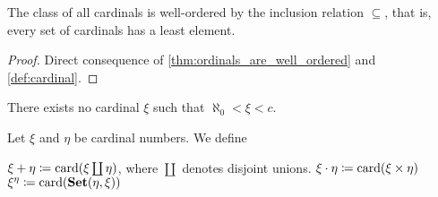 \begin{proposition}\label{thm:cardinals_well_ordered}
  The class of all cardinals is well-ordered by the inclusion relation \( \subseteq \), that is, every set of cardinals has a least element.
\end{proposition}
\begin{proof}
  Direct consequence of \cref{thm:ordinals_are_well_ordered} and \cref{def:cardinal}.
\end{proof}

\begin{hypothesis}\label{hyp:continuum_hypothesis}
  There exists no cardinal \( \xi \) such that \( \aleph_0 < \xi < c \).
\end{hypothesis}

\begin{definition}\label{def:cardinal_arithmetic}
  Let \( \xi \) and \( \eta \) be cardinal numbers. We define
  \begin{description}
     \( \xi + \eta \coloneqq \operatorname{card}(\xi \coprod \eta) \), where \( \coprod \) denotes disjoint unions.
     \( \xi \cdot \eta \coloneqq \operatorname{card}(\xi \times \eta) \)
     \( \xi^\eta \coloneqq \operatorname{card}(\operatorname{\mathbf{Set}}(\eta, \xi)) \)
  \end{description}
\end{definition}
